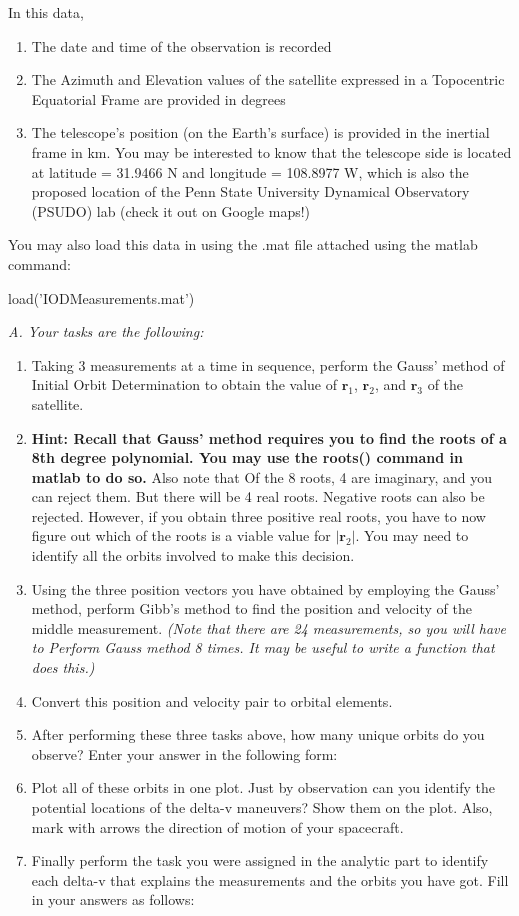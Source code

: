 \documentclass[12pt, letterpaper]{aiaa-tc}
\begin{document}
In this data,
\begin{enumerate}
    \item The date and time of the observation is recorded
    \item The Azimuth and Elevation values of the satellite expressed in a Topocentric Equatorial Frame are provided
    in degrees
    \item The telescope's position (on the Earth's surface) is provided in the inertial frame in km. You may be interested
    to know that the telescope side is located at latitude = 31.9466 N and longitude = 108.8977 W, which is
    also the proposed location of the Penn State University Dynamical Observatory (PSUDO) lab (check it out
    on Google maps!)
\end{enumerate}
You may also load this data in using the .mat file attached using the matlab command:

\quad load('IODMeasurements.mat')

\raggedright \textit{A. Your tasks are the following:}

\begin{enumerate}
    \item Taking 3 measurements at a time in sequence, perform the Gauss' method of Initial Orbit Determination to
    obtain the value of $\bm{r}_1$, $\bm{r}_2$, and $\bm{r}_3$ of the satellite.
    \item \textbf{Hint: Recall that Gauss' method requires you to find the roots of a 8th degree polynomial. You may
    use the roots() command in matlab to do so.} Also note that Of the 8 roots, 4 are imaginary, and you can
    reject them. But there will be 4 real roots. Negative roots can also be rejected. However, if you obtain three
    positive real roots, you have to now figure out which of the roots is a viable value for $|\bm{r}_2|$. You may need to
    identify all the orbits involved to make this decision.
    \item Using the three position vectors you have obtained by employing the Gauss' method, perform Gibb's method
    to find the position and velocity of the middle measurement. \textit{(Note that there are 24 measurements, so you
    will have to Perform Gauss method 8 times. It may be useful to write a function that does this.)}
    \item Convert this position and velocity pair to orbital elements.
    \item After performing these three tasks above, how many unique orbits do you observe? Enter your answer in the
    following form:
    \item Plot all of these orbits in one plot. Just by observation can you identify the potential locations of the delta-v
    maneuvers? Show them on the plot. Also, mark with arrows the direction of motion of your spacecraft.
    \item Finally perform the task you were assigned in the analytic part to identify each delta-v that explains the
    measurements and the orbits you have got. Fill in your answers as follows:
\end{enumerate}
\end{document}
